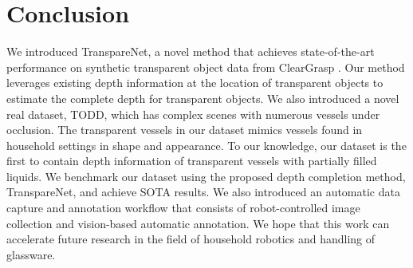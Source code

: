 \documentclass{article}
\newcommand{\algoName}{TranspareNet\xspace}
\newcommand{\dataName}{TODD}
\begin{document}

\section{Conclusion}
\label{sec:conclusion}
We introduced \algoName, a novel method that achieves state-of-the-art performance on synthetic transparent object data from ClearGrasp \citep{ClearGrasp}. Our method leverages existing depth information at the location of transparent objects to estimate the complete depth for transparent objects. We also introduced a novel real dataset, \dataName, which has complex scenes with numerous vessels under occlusion. The transparent vessels in our dataset mimics vessels found in household settings in shape and appearance. To our knowledge, our dataset is the first to contain depth information of transparent vessels with partially filled liquids. We benchmark our dataset using the proposed depth completion method, \algoName, and achieve SOTA results. We also introduced an automatic data capture and annotation workflow that consists of robot-controlled image collection and vision-based automatic annotation. We hope that this work can accelerate future research in the field of household robotics and handling of glassware.


\end{document}
